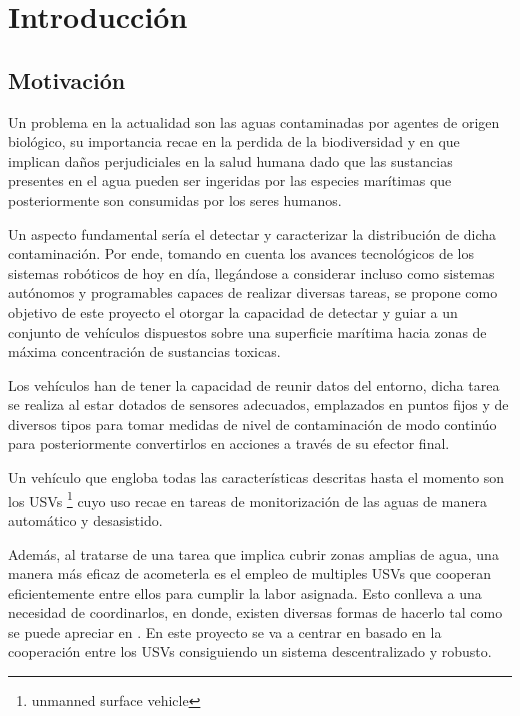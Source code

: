 

\chapter{Introducción} 
\label{ch:chapter1}
\setlength{\parindent}{0cm}
\setlength{\parskip}{4mm}

\section{Motivación}\label{Motiv}

Un problema en la actualidad son las aguas contaminadas por agentes de origen biológico, su importancia recae en la perdida de la biodiversidad y en que implican daños perjudiciales en la salud humana dado que las sustancias presentes en el agua pueden ser ingeridas por las especies marítimas que posteriormente son consumidas por los seres humanos.

Un aspecto fundamental sería el detectar y caracterizar la distribución de dicha contaminación. Por ende, tomando en cuenta los avances tecnológicos de los sistemas robóticos de hoy en día, llegándose a considerar incluso como sistemas autónomos y programables capaces de realizar diversas tareas, se propone como objetivo de este proyecto el otorgar la capacidad de detectar y guiar a un conjunto de vehículos dispuestos sobre una superficie marítima hacia zonas de máxima concentración de sustancias toxicas.

Los vehículos han de tener la capacidad de reunir datos del entorno, dicha tarea se realiza al estar dotados de sensores adecuados, emplazados en puntos fijos y de diversos tipos para tomar medidas de nivel de contaminación de modo continúo para posteriormente convertirlos en acciones a través de su efector final.

Un vehículo que engloba todas las características descritas hasta el momento son los USVs \footnote[1]{unmanned surface vehicle} cuyo uso recae en tareas de monitorización de las aguas de manera automático y desasistido.

Además, al tratarse de una tarea que implica cubrir zonas amplias de agua, una manera más eficaz de acometerla es el empleo de multiples USVs que cooperan eficientemente entre ellos para cumplir la labor asignada. Esto conlleva a una necesidad de coordinarlos, en donde, existen diversas formas de hacerlo tal como se puede apreciar en \cite{Otra_Coorporativa}. En este proyecto se va a centrar en \cite{Control_Formacion} basado en la cooperación entre los USVs consiguiendo un sistema descentralizado y robusto.\\

